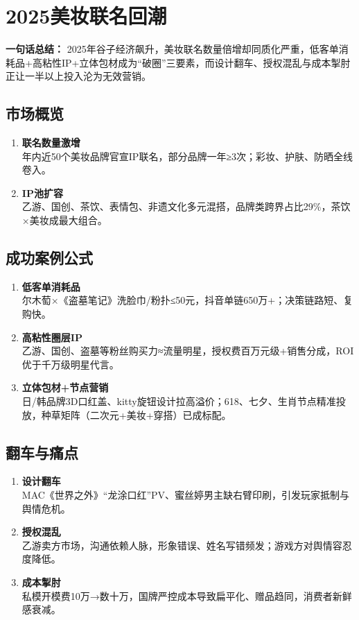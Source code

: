 \section{2025美妆联名回潮}
\textbf{一句话总结：}  
2025年谷子经济飙升，美妆联名数量倍增却同质化严重，低客单消耗品+高粘性IP+立体包材成为“破圈”三要素，而设计翻车、授权混乱与成本掣肘正让一半以上投入沦为无效营销。

\subsection{市场概览}
\begin{enumerate}[leftmargin=*, nosep]
    \item \textbf{联名数量激增}  \\
    年内近50个美妆品牌官宣IP联名，部分品牌一年≥3次；彩妆、护肤、防晒全线卷入。
    \item \textbf{IP池扩容}  \\
    乙游、国创、茶饮、表情包、非遗文化多元混搭，品牌类跨界占比29\%，茶饮×美妆成最大组合。
\end{enumerate}

\subsection{成功案例公式}
\begin{enumerate}[leftmargin=*, nosep]
    \item \textbf{低客单消耗品}  \\
    尔木萄×《盗墓笔记》洗脸巾/粉扑≤50元，抖音单链650万+；决策链路短、复购快。
    \item \textbf{高粘性圈层IP}  \\
    乙游、国创、盗墓等粉丝购买力≈流量明星，授权费百万元级+销售分成，ROI优于千万级明星代言。
    \item \textbf{立体包材+节点营销}  \\
    日/韩品牌3D口红盖、kitty旋钮设计拉高溢价；618、七夕、生肖节点精准投放，种草矩阵（二次元+美妆+穿搭）已成标配。
\end{enumerate}

\subsection{翻车与痛点}
\begin{enumerate}[leftmargin=*, nosep]
    \item \textbf{设计翻车}  \\
    MAC《世界之外》“龙涂口红”PV、蜜丝婷男主缺右臂印刷，引发玩家抵制与舆情危机。
    \item \textbf{授权混乱}  \\
    乙游卖方市场，沟通依赖人脉，形象错误、姓名写错频发；游戏方对舆情容忍度降低。
    \item \textbf{成本掣肘}  \\
    私模开模费10万→数十万，国牌严控成本导致扁平化、赠品趋同，消费者新鲜感衰减。
\end{enumerate}

